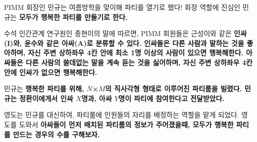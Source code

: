 PIMM 회장인 민규는 여름방학을 맞이해 파티를 열기로 했다! 회장 역할에 진심인 민규는 \bf{모두가 행복한 파티}를 만들기로 한다.$$$$

수석 인간관계 연구원인 종현이의 말에 따르면, PIMM 회원들은 근성이와 같은 \bf{인싸(I)}와, 윤수와 같은 \bf{아싸(A)}로 분류할 수 있다. \bf{인싸}들은 다른 사람과 말하는 것을 좋아하며, \bf{자신 주변 상하좌우 4칸 안에 최소 1명 이상의 사람이 있으면 행복해한다.} \bf{아싸}들은 다른 사람의 쓸데없는 말을 계속 듣는 것을 싫어하며, \bf{자신 주변 상하좌우 4칸 안에 인싸가 없으면 행복해한다.}

민규는 \bf{행복한 파티}를 위해, $N$×$M$의 직사각형 형태로 이루어진 파티룸을 빌렸다. 민규는 정환이에게서 인싸 $X$명과, 아싸 $Y$명이 파티에 참여한다고 전달받았다.

영도는 민규를 대신하여, 파티룸에 인원들의 자리를 배정하는 역할을 맡게 되었다. 영도를 도와서 \bf{아싸들이 먼저 배치된 파티룸}의 정보가 주어졌을때, \bf{모두가 행복한 파티}를 만드는 경우의 수를 구해보자.
